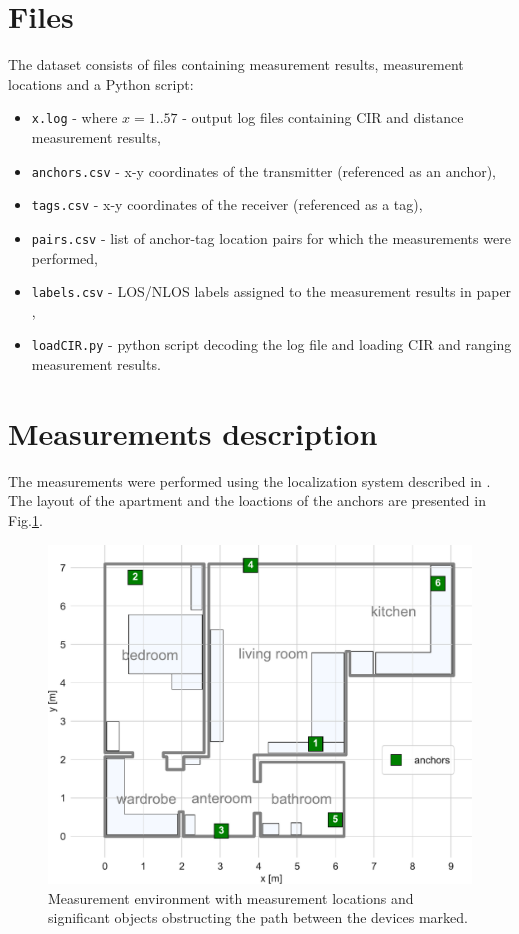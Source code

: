 \documentclass[conference]{IEEEtran}
\begin{document}
\section{Files}
The dataset consists of files containing measurement results, measurement locations and a Python script:
\begin{itemize}
\item \texttt{x.log} - where $x=1..57$ - output log files containing CIR and distance measurement results,
\item \texttt{anchors.csv} - x-y coordinates of the transmitter (referenced as an anchor),
\item \texttt{tags.csv} - x-y coordinates of the receiver (referenced as a tag),
\item \texttt{pairs.csv} - list of anchor-tag location pairs for which the measurements were performed,
\item \texttt{labels.csv} - LOS/NLOS labels assigned to the measurement results in paper \cite{b1},
\item \texttt{loadCIR.py} - python script decoding the log file and loading CIR and ranging measurement results.
\end{itemize} 


\section{Measurements description}

The measurements were performed using the localization system described in \cite{b1}. The layout of the apartment and the loactions of the anchors are presented in Fig.\ref{plan}.

\begin{figure}[h]
\centerline{\includegraphics[width=\columnwidth]{figs/layout}}
\caption{Measurement environment with measurement locations and significant objects obstructing the path between the devices marked.}
\label{plan}
\end{figure}
\end{document}
